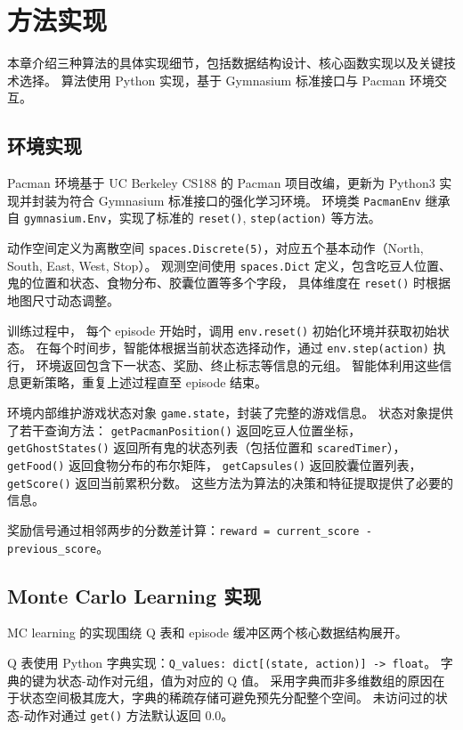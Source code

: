 \section{方法实现}

本章介绍三种算法的具体实现细节，包括数据结构设计、核心函数实现以及关键技术选择。
算法使用 Python 实现，基于 Gymnasium 标准接口与 Pacman 环境交互。

\subsection{环境实现}

Pacman 环境基于 UC Berkeley CS188 的 Pacman 项目改编，更新为 Python3 实现并封装为符合 Gymnasium 标准接口的强化学习环境。
环境类 \texttt{PacmanEnv} 继承自 \texttt{gymnasium.Env}，实现了标准的 \texttt{reset()}, \texttt{step(action)} 等方法。

动作空间定义为离散空间 \texttt{spaces.Discrete(5)}，对应五个基本动作（North, South, East, West, Stop）。
观测空间使用 \texttt{spaces.Dict} 定义，包含吃豆人位置、鬼的位置和状态、食物分布、胶囊位置等多个字段，
具体维度在 \texttt{reset()} 时根据地图尺寸动态调整。

训练过程中，
每个 episode 开始时，调用 \texttt{env.reset()} 初始化环境并获取初始状态。
在每个时间步，智能体根据当前状态选择动作，通过 \texttt{env.step(action)} 执行，
环境返回包含下一状态、奖励、终止标志等信息的元组。
智能体利用这些信息更新策略，重复上述过程直至 episode 结束。

环境内部维护游戏状态对象 \texttt{game.state}，封装了完整的游戏信息。
状态对象提供了若干查询方法：
\texttt{getPacmanPosition()} 返回吃豆人位置坐标，
\texttt{getGhostStates()} 返回所有鬼的状态列表（包括位置和 \texttt{scaredTimer}），
\texttt{getFood()} 返回食物分布的布尔矩阵，
\texttt{getCapsules()} 返回胶囊位置列表，
\texttt{getScore()} 返回当前累积分数。
这些方法为算法的决策和特征提取提供了必要的信息。

奖励信号通过相邻两步的分数差计算：\texttt{reward = current\_score - previous\_score}。

\subsection{Monte Carlo Learning 实现}

MC learning 的实现围绕 Q 表和 episode 缓冲区两个核心数据结构展开。


Q 表使用 Python 字典实现：\texttt{Q\_values: dict[(state, action)] -> float}。
字典的键为状态-动作对元组，值为对应的 Q 值。
采用字典而非多维数组的原因在于状态空间极其庞大，字典的稀疏存储可避免预先分配整个空间。
未访问过的状态-动作对通过 \texttt{get()} 方法默认返回 0.0。

